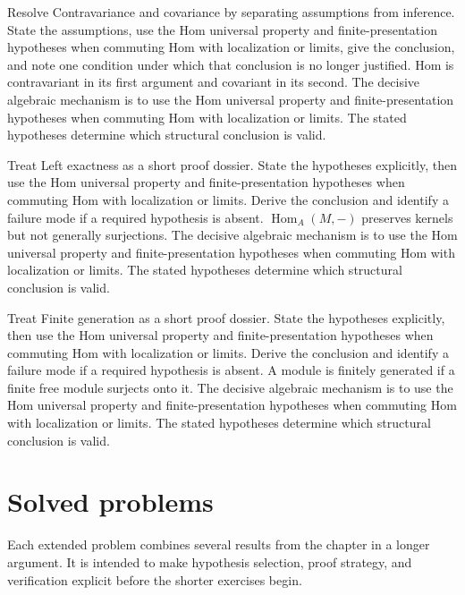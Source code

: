 \begin{example}\label{ex:v12-worked-02}
Resolve Contravariance and covariance by separating assumptions from inference. State the assumptions, use the Hom universal property and finite-presentation hypotheses when commuting Hom with localization or limits, give the conclusion, and note one condition under which that conclusion is no longer justified. Hom is contravariant in its first argument and covariant in its second. The decisive algebraic mechanism is to use the Hom universal property and finite-presentation hypotheses when commuting Hom with localization or limits. The stated hypotheses determine which structural conclusion is valid.
\end{example}

\begin{example}\label{ex:v12-worked-03}
Treat Left exactness as a short proof dossier. State the hypotheses explicitly, then use the Hom universal property and finite-presentation hypotheses when commuting Hom with localization or limits. Derive the conclusion and identify a failure mode if a required hypothesis is absent. $\operatorname{Hom}_A(M,-)$ preserves kernels but not generally surjections. The decisive algebraic mechanism is to use the Hom universal property and finite-presentation hypotheses when commuting Hom with localization or limits. The stated hypotheses determine which structural conclusion is valid.
\end{example}

\begin{example}\label{ex:v12-worked-04}
Treat Finite generation as a short proof dossier. State the hypotheses explicitly, then use the Hom universal property and finite-presentation hypotheses when commuting Hom with localization or limits. Derive the conclusion and identify a failure mode if a required hypothesis is absent. A module is finitely generated if a finite free module surjects onto it. The decisive algebraic mechanism is to use the Hom universal property and finite-presentation hypotheses when commuting Hom with localization or limits. The stated hypotheses determine which structural conclusion is valid.
\end{example}

\section{Solved problems}
Each extended problem combines several results from the chapter in a longer argument. It is intended to make hypothesis selection, proof strategy, and verification explicit before the shorter exercises begin.

